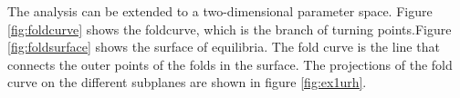 The analysis can be extended to a two-dimensional parameter space. Figure \ref{fig:foldcurve} shows the foldcurve, which is the branch of turning points.Figure \ref{fig:foldsurface} shows the surface of equilibria. The fold curve is the line that connects the outer points of the folds in the surface. The projections of the fold curve on the different subplanes are shown in figure \ref{fig:ex1urh}. 
\begin{figure}[htp]
\centering
{}
\caption{}
\label{fig:}
\end{figure}

